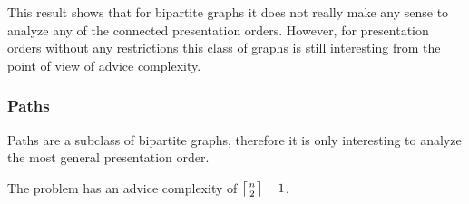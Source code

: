 This result shows that for bipartite graphs it does not really make any
sense to analyze any of the connected presentation orders. However, for
presentation orders without any restrictions this class of graphs is still
interesting from the point of view of advice complexity.

\subsubsection{Paths}

Paths are a subclass of bipartite graphs, therefore it is only interesting
to analyze the most general presentation order.

\begin{theorem}\label{theorem:paths-any}
    The  problem has an advice complexity of
    $\ceil*{\frac{n}{2}} - 1$.
\end{theorem}

